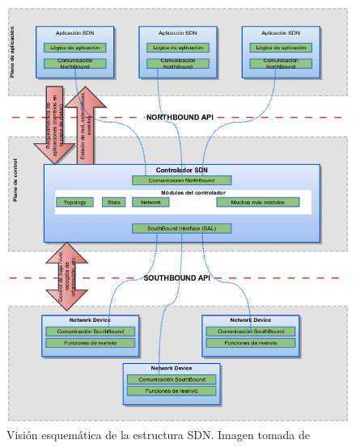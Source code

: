 \documentclass[a4paper,11pt]{book}
\begin{document}
\begin{figure}[tb]
\centering
\includegraphics[scale=0.4]{./figuras/SDNSchematic}
\caption[Architecture Overview \ac{SDN}.]{Visión esquemática de la estructura \ac{SDN}. Imagen tomada de \cite{SDN11}} \label{SDNSchematic}
\end{figure}
\end{document}
